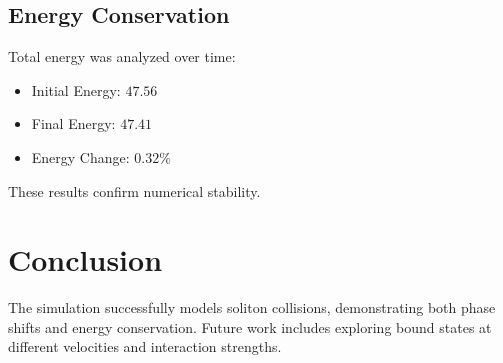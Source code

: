 \documentclass{article}
\begin{document}
\subsection{Energy Conservation}
Total energy was analyzed over time:
\begin{itemize}
    \item Initial Energy: $47.56$
    \item Final Energy: $47.41$
    \item Energy Change: $0.32\%$
\end{itemize}
These results confirm numerical stability.

\section{Conclusion}
The simulation successfully models soliton collisions, demonstrating both phase shifts and energy conservation. Future work includes exploring bound states at different velocities and interaction strengths.
\end{document}
